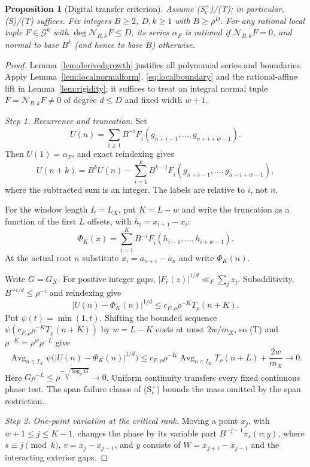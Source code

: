 \documentclass[11pt,a4paper]{article}
\newtheorem{proposition}[theorem]{Proposition}
\DeclareMathOperator{\Avg}{Avg}
\begin{document}
\begin{proposition}[Digital transfer criterion]\label{prop:localconsumer}
Assume (S$^+_c$)/(T); in particular, (S)/(T) suffices.
Fix integers $B\ge2$, $D,k\ge1$ with $B\ge\rho^D$.
For any rational local tuple $F\in\mathcal G^k$ with
$\deg\mathcal N_{B,k}F\le D$, its series $\alpha_F$
is rational if $\mathcal N_{B,k}F=0$, and normal to base $B^k$
(and hence to base $B$) otherwise.
\end{proposition}
\begin{proof}
Lemma~\ref{lem:derivedgrowth} justifies all polynomial series and
boundaries. Apply Lemma~\ref{lem:localnormalform},
\eqref{eq:localboundary} and the rational-affine lift
in Lemma~\ref{lem:rigidity}; it suffices to treat an integral normal tuple
$F=\mathcal N_{B,k}F\ne0$ of degree $d\le D$ and fixed width $w+1$.

\smallskip\noindent\emph{Step 1. Recurrence and truncation.}
Set
\[
 U(n)=\sum_{i\ge1}B^{-i}
          F_{\bar i}(g_{n+i-1},\ldots,g_{n+i+w-1}).
\]
Then $U(1)=\alpha_F$, and exact reindexing gives
\begin{equation}\label{eq:sharedrecursion}
 U(n+k)=B^kU(n)-\sum_{i=1}^k B^{k-i}
                   F_{\bar i}(g_{n+i-1},\ldots,g_{n+i+w-1}),
\end{equation}
where the subtracted sum is an integer. The labels are relative to $i$, not $n$.

For the window length $L=L_X$, put $K=L-w$ and write the truncation as
a function of the first $L$ offsets, with $h_i=x_{i+1}-x_i$:
\[
 \Phi_K(x)=\sum_{i=1}^{K}B^{-i}
                    F_{\bar i}(h_{i-1},\ldots,h_{i+w-1}).
\]
At the actual root $n$ substitute $x_i=a_{n+i}-a_n$ and write
$\Phi_K(n)$.

Write $G=G_X$. For positive integer gaps, $|F_r(z)|^{1/d}\ll_F\sum_jz_j$.
Subadditivity, $B^{-i/d}\le\rho^{-i}$ and reindexing give
\[
 |U(n)-\Phi_K(n)|^{1/d}
       \le c_{F,\rho}\rho^{-K}T_\rho(n+K).
\]
Put $\psi(t)=\min(1,t)$. Shifting the bounded sequence
$\psi(c_{F,\rho}\rho^{-K}T_\rho(n+K))$ by $w=L-K$ costs at most
$2w/m_X$, so (T) and $\rho^{-K}=\rho^w\rho^{-L}$ give
\[
 \Avg_{n\in I_X}\psi\bigl(|U(n)-\Phi_K(n)|^{1/d}\bigr)
 \le c_{F,\rho}\rho^{-K}\Avg_{n\in I_X}T_\rho(n+L)
                         +\frac{2w}{m_X}\longrightarrow0.
\]
Here $G\rho^{-L}\le\rho^{-\sqrt{\log_\rho G}}\to0$.
Uniform continuity transfers every fixed continuous phase test.
The span-failure clause of (S$^+_c$) bounds the mass omitted by the
span restriction.

\smallskip\noindent\emph{Step 2. One-point variation at the critical rank.}
Moving a point $x_j$, with
$w+1\le j\le K-1$, changes the phase by its variable part
$B^{-j-1}\pi_s(v;y)$, where $s\equiv j\pmod k$,
$v=x_j-x_{j-1}$, and $y$ consists of
$W=x_{j+1}-x_{j-1}$ and the interacting exterior gaps.


\end{proof}
\end{document}
